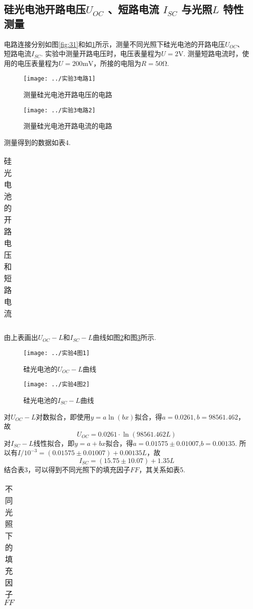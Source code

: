 \documentclass[11pt]{article}
\begin{document}
\subsection{硅光电池开路电压$ U_{OC} $ 、短路电流 $ I_{SC}  $ 与光照$  L $ 特性测量}
电路连接分别如图\ref{fig:31}和如\ref{fig:32}所示，测量不同光照下硅光电池的开路电压$ U_{OC}  $、短路电流$  I_{SC}  $. 实验中测量开路电压时，电压表量程为$ U=2\text{V} $. 测量短路电流时，使用的电压表量程为$ U=200\text{mV} $，所接的电阻为$ R=50 $Ω.
\begin{figure}[htbp]
	\centering
	\begin{minipage}{0.4\linewidth}
		\centering
		\texttt{[image: ../实验3电路1]}
		\caption{测量硅光电池开路电压的电路}
		\label{fig:31}
	\end{minipage}
	\begin{minipage}{0.4\linewidth}
		\centering
		\texttt{[image: ../实验3电路2]}
		\caption{测量硅光电池开路电流的电路}
		\label{fig:32}
	\end{minipage}
\end{figure}

测量得到的数据如表4.
\begin{table}[htbp]\small
	\centering
	\caption{硅光电池的开路电压和短路电流}
	\begin{tabular}{cccccccc}
	\end{tabular}
\end{table}

由上表画出$ U_{OC}-L $和$ I_{SC}-L $曲线如图\ref{fig:41}和图\ref{fig:42}所示.
\begin{figure}[htbp]
	\centering
	\texttt{[image: ../实验4图1]}
	\caption{硅光电池的$ U_{OC}-L $曲线}
	\label{fig:41}
\end{figure}
\begin{figure}[htbp]
	\centering
	\texttt{[image: ../实验4图2]}
	\caption{硅光电池的$ I_{SC}-L $曲线}
	\label{fig:42}
\end{figure}

对$ U_{OC}-L $对数拟合，即使用$ y=a\ln (bx) $拟合，得$ a=0.0261,b=98561.462 $，故$$ U_{OC}=0.0261\cdot \ln(98561.462 L) $$
对$ I_{SC}-L $线性拟合，即$ y=a+bx $拟合，得$ a=0.01575\pm 0.01007 $,$ b=0.00135 $. 所以有$ I/10^{-3}=(0.01575\pm 0.01007)+0.00135L $，故
$$ I_{SC}=(15.75\pm 10.07)+1.35 L $$
结合表3，可以得到不同光照下的填充因子$ FF $，其关系如表5.
\begin{table}[htbp]\small
	\centering
	\caption{不同光照下的填充因子$ FF $}
	\begin{tabular}{cccccc}
	\end{tabular}
\end{table}
\end{document}
